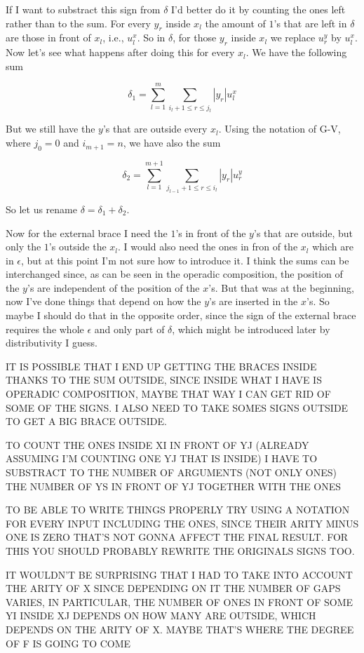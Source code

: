 \documentclass[twoside]{article}
\begin{document}
If I want to substract this sign from $\delta$ I'd better do it by counting the ones left rather than to the sum. For every $y_r$ inside $x_l$ the amount of $1$'s that are left in $\delta$ are those in front of $x_l$, i.e., $u^x_l$. So in $\delta$, for those $y_r$ inside $x_l$ we replace $u^y_r$ by $u^x_l$. Now let's see what happens after doing this for every $x_l$. We have the following sum 

$$\delta_1=\sum_{l=1}^m\sum_{i_l+1\leq r\leq j_l}|y_r|u^x_l$$

But we still have the $y$'s that are outside every $x_l$. Using the notation of G-V, where $j_0=0$ and $i_{m+1}=n$, we have also the sum

$$\delta_2=\sum_{l=1}^{m+1}\sum_{j_{l-1}+1\leq r\leq i_l}|y_r|u^y_r$$

So let us rename $\delta=\delta_1+\delta_2$.

Now for the external brace I need the $1$'s in front of the $y$'s that are outside, but only the $1$'s outside the $x_l$. I would also need the ones in fron of the $x_l$ which are in $\epsilon$, but at this point I'm not sure how to introduce it. I think the sums can be interchanged since, as can be seen in the operadic composition, the position of the $y$'s are independent of the position of the $x$'s. But that was at the beginning, now I've done things that depend on how the $y$'s are inserted in the $x$'s. So maybe I should do that in the opposite order, since the sign of the external brace requires the whole $\epsilon$ and only part of $\delta$, which might be introduced later by distributivity I guess.

IT IS POSSIBLE THAT I END UP GETTING THE BRACES INSIDE THANKS TO THE SUM OUTSIDE, SINCE INSIDE WHAT I HAVE IS OPERADIC COMPOSITION, MAYBE THAT WAY I CAN GET RID OF SOME OF THE SIGNS. I ALSO NEED TO TAKE SOMES SIGNS OUTSIDE TO GET A BIG BRACE OUTSIDE.

TO COUNT THE ONES INSIDE XI IN FRONT OF YJ (ALREADY ASSUMING I'M COUNTING ONE YJ THAT IS INSIDE) I HAVE TO SUBSTRACT TO THE NUMBER OF ARGUMENTS (NOT ONLY ONES) THE NUMBER OF YS IN FRONT OF YJ TOGETHER WITH THE ONES

TO BE ABLE TO WRITE THINGS PROPERLY TRY USING A NOTATION FOR EVERY INPUT INCLUDING THE ONES, SINCE THEIR ARITY MINUS ONE IS ZERO THAT'S NOT GONNA AFFECT THE FINAL RESULT. FOR THIS YOU SHOULD PROBABLY REWRITE THE ORIGINALS SIGNS TOO.

IT WOULDN'T BE SURPRISING THAT I HAD TO TAKE INTO ACCOUNT THE ARITY OF X SINCE DEPENDING ON IT THE NUMBER OF GAPS VARIES, IN PARTICULAR, THE NUMBER OF ONES IN FRONT OF SOME YI INSIDE XJ DEPENDS ON HOW MANY ARE OUTSIDE, WHICH DEPENDS ON THE ARITY OF X. MAYBE THAT'S WHERE THE DEGREE OF F IS GOING TO COME
\end{document}
